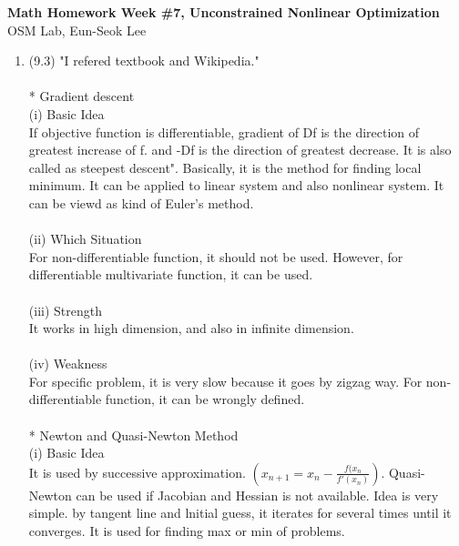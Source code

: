 \documentclass[letterpaper,12pt]{article}
\theoremstyle{definition}
\begin{document}
\begin{flushleft}
   \textbf{\large{Math Homework Week \#7, Unconstrained Nonlinear Optimization}} \\[5pt]
   OSM Lab, Eun-Seok Lee \\[5pt]

\end{flushleft}

\vspace{5mm}

\begin{enumerate}



	\item (9.3)  "I refered textbook and Wikipedia."\\ \\
* Gradient descent \\
(i) Basic Idea\\
If objective function is differentiable, gradient of Df is the direction of greatest increase of f. and -Df is the direction of greatest decrease. It is also called as steepest descent". Basically, it is the method for finding local minimum. It can be applied to linear system and also nonlinear system. It can be viewd as kind of Euler's method.\\ \\
(ii) Which Situation\\
For non-differentiable function, it should not be used. However, for differentiable multivariate function, it can be used.\\ \\
(iii) Strength\\
It works in high dimension, and also in infinite dimension. \\ \\
(iv) Weakness\\
For specific problem, it is very slow because it goes by zigzag way. For non-differentiable function, it can be wrongly defined. \\ \\
* Newton and Quasi-Newton Method\\
(i) Basic Idea\\
It is used by successive approximation. $(x_{n+1} = x_n - \frac{f(x_n}{f'(x_n)})$. Quasi-Newton can be used if Jacobian and Hessian is not available.  Idea is very simple. by tangent line and lnitial guess, it iterates for several times until it converges. It is used for finding max or min of problems.\\ \\

\end{enumerate}
\end{document}

